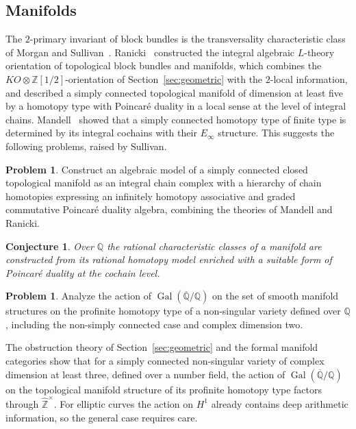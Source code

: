 \documentclass[11pt]{amsart}
\theoremstyle{plain}
\newtheorem*{conjecture*}{Conjecture}
\theoremstyle{definition}
\newtheorem{problem}[theorem]{Problem}
\numberwithin{equation}{section}
\newcommand{\Z}{\mathbb{Z}}
\newcommand{\Q}{\mathbb{Q}}
\newcommand{\Zhat}{\widehat{\mathbb{Z}}}
\newcommand{\Qbar}{\overline{\mathbb{Q}}}
\newcommand{\KO}{\mathit{KO}}
\newcommand{\units}{^{\times}}
\DeclareMathOperator{\Gal}{Gal}
\begin{document}
\subsection{Manifolds}
The $2$-primary invariant of block bundles is the transversality characteristic class of Morgan and Sullivan~\cite{MS74}.
Ranicki~\cite{Ranicki} constructed the integral algebraic $L$-theory orientation of topological block bundles and manifolds, which combines the $\KO\otimes\Z[1/2]$-orientation of Section~\ref{sec:geometric} with the $2$-local information, and described a simply connected topological manifold of dimension at least five by a homotopy type with Poincar\'e duality in a local sense at the level of integral chains.
Mandell~\cite{Mandell} showed that a simply connected homotopy type of finite type is determined by its integral cochains with their $E_\infty$ structure.
This suggests the following problems, raised by Sullivan.

\begin{problem}
Construct an algebraic model of a simply connected closed topological manifold as an integral chain complex with a hierarchy of chain homotopies expressing an infinitely homotopy associative and graded commutative Poincar\'e duality algebra, combining the theories of Mandell and Ranicki.
\end{problem}

\begin{conjecture*}
Over $\Q$ the rational characteristic classes of a manifold are constructed from its rational homotopy model enriched with a suitable form of Poincar\'e duality at the cochain level.
\end{conjecture*}

\begin{problem}
Analyze the action of $\Gal(\Qbar/\Q)$ on the set of smooth manifold structures on the profinite homotopy type of a non-singular variety defined over $\Q$, including the non-simply connected case and complex dimension two.
\end{problem}

The obstruction theory of Section~\ref{sec:geometric} and the formal manifold categories show that for a simply connected non-singular variety of complex dimension at least three, defined over a number field, the action of $\Gal(\Qbar/\Q)$ on the topological manifold structure of its profinite homotopy type factors through $\Zhat\units$.
For elliptic curves the action on $H^1$ already contains deep arithmetic information, so the general case requires care.
\end{document}
